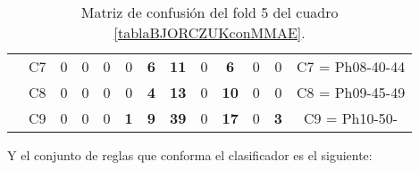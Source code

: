 \begin{table}[H]
{\begin{tabular}{|ccrrrrrrrrrrc|}
\multicolumn{1}{|c|}{}                                      & \multicolumn{1}{c|}{C7} & \multicolumn{1}{c|}{0}  & \multicolumn{1}{c|}{0}          & \multicolumn{1}{c|}{0}          & \multicolumn{1}{c|}{0}          & \multicolumn{1}{c|}{\textbf{6}} & \multicolumn{1}{c|}{\textbf{11}} & \multicolumn{1}{c|}{0}          & \multicolumn{1}{c|}{\textbf{6}}  & \multicolumn{1}{c|}{0}          & \multicolumn{1}{c|}{0}          & C7 = Ph08-40-44   \\ \cline{2-13}
\multicolumn{1}{|c|}{}                                      & \multicolumn{1}{c|}{C8} & \multicolumn{1}{c|}{0}  & \multicolumn{1}{c|}{0}          & \multicolumn{1}{c|}{0}          & \multicolumn{1}{c|}{0}          & \multicolumn{1}{c|}{\textbf{4}} & \multicolumn{1}{c|}{\textbf{13}} & \multicolumn{1}{c|}{0}          & \multicolumn{1}{c|}{\textbf{10}} & \multicolumn{1}{c|}{0}          & \multicolumn{1}{c|}{0}          & C8 = Ph09-45-49   \\ \cline{2-13}
\multicolumn{1}{|c|}{}                                      & \multicolumn{1}{c|}{C9} & \multicolumn{1}{c|}{0}  & \multicolumn{1}{c|}{0}          & \multicolumn{1}{c|}{0}          & \multicolumn{1}{c|}{\textbf{1}} & \multicolumn{1}{c|}{\textbf{9}} & \multicolumn{1}{c|}{\textbf{39}} & \multicolumn{1}{c|}{0}          & \multicolumn{1}{c|}{\textbf{17}} & \multicolumn{1}{c|}{0}          & \multicolumn{1}{c|}{\textbf{3}} & C9 = Ph10-50-     \\ \hline
\end{tabular}%
}
\caption{Matriz de confusión del fold 5 del cuadro \ref{tablaBJORCZUKconMMAE}.}
\end{table}

\newpage

Y el conjunto de reglas que conforma el clasificador es el siguiente:

